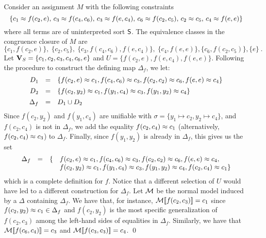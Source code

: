 \documentclass{svjour3}                     %
\begin{document}
\begin{example}
Consider an assignment $M$ with the following constraints 
\[
\{c_1 \approx f(c_2,e),\, c_3 \approx f(c_4,c_6),\, c_3 \approx f(e,c_4),\, c_6 \approx f( c_2, c_5 ),\, c_2 \approx c_5,\, c_4 \approx f(e,e) \}
\]
where all terms are of uninterpreted sort $\mathsf{S}$.
The equivalence classes in the congruence closure of $M$ are
\[
 \{ c_1, f( c_2, e ) \},\; 
 \{ c_2, c_5 \},\;  
 \{ c_3, f( c_4, c_6 ), f( e, c_4 ) \},\;
 \{ c_4, f( e, e ) \}, \{ c_6, f( c_2, c_5 ) \}, \{ e \} \ .
\]
Let $\mathbf{V}_S = \{ c_1, c_2, c_3, c_4, c_6, e \}$ 
and $U = \{ f( c_2, e ), f( e, c_4 ), f( e, e ) \}$.
Following the procedure to construct the defining map $\Delta_f$,
we let:
\[\begin{array}{r@{\hspace{1em}}c@{\hspace{1em}}l}
D_1 & = & \{ f( c_2, e ) \teq c_1, f( c_4, c_6 ) \teq c_3, f( c_2, c_2 ) \teq c_6, f( e, e ) \teq c_4 \} 
\\[1ex]
D_2 & = & \{ f( c_2, y_2 ) \teq c_1, f( y_1, c_4 ) \teq c_3, f( y_1, y_2 ) \teq c_4 \}
\\[1ex]
\Delta_f & = & D_1 \cup D_2 
\end{array}\]
Since $f( c_2, y_2 )$ and $f( y_1, c_4 )$ are unifiable with $\sigma = \{ y_1 \mapsto c_2, y_2 \mapsto c_4 \}$,
and $f( c_2, c_4 )$ is not in $\Delta_f$, we add the equality $f( c_2, c_4 ) \approx c_1$ (alternatively, $f( c_2, c_4 ) \approx c_3$) to $\Delta_f$.
Finally, since $f( y_1, y_2 )$ is already in $\Delta_f$, this gives us the set
\[\begin{array}{r@{\hspace{1em}}c@{\hspace{1em}}ll}
\Delta_f & = & \{ & f( c_2, e ) \teq c_1, f( c_4, c_6 ) \teq c_3, f( c_2, c_2 ) \teq c_6, f( e, e ) \teq c_4, \\
 & & & f( c_2, y_2 ) \teq c_1, f( y_1, c_4 ) \teq c_3, f( y_1, y_2 ) \teq c_4, f( c_2, c_4 ) \teq c_1 \}
\end{array}\]
which is a complete definition for $f$.
Notice that a different selection of $U$ would have led to a different construction for $\Delta_f$.
Let $\mathcal{M}$ be the normal model induced by a $\Delta$ containing $\Delta_f$.
We have that, for instance, $\mathcal{M} [ \negthinspace [ f( c_2, c_3 ) ] \negthinspace ] = c_1$
since $f( c_2, y_2 ) \approx c_1 \in \Delta_f$ and
$f( c_2, y_2 )$ is the most specific generalization of $f( c_2, c_3 )$ among the left-hand sides of equalities in $\Delta_f$.
Similarly, we have that $\mathcal{M} [ \negthinspace [ f( c_6, c_4 ) ] \negthinspace ] = c_3$ and $\mathcal{M} [ \negthinspace [ f( c_3, c_3 ) ] \negthinspace ] = c_4$.
\qed
\end{example}
\end{document}
